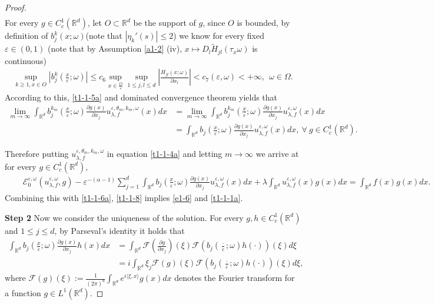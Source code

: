 \documentclass[11pt,draft, reqno]{amsart}
\renewcommand{\le}{\leqslant}
\renewcommand{\ge}{\geqslant}
\def\EE{{\mathcal E}}
\newcommand{\F}{\mathscr{F}}
\newcommand{\R}{\mathds R}
\newcommand{\e}{\varepsilon}
\newcommand{\w}{\omega}
\theoremstyle{definition}
\numberwithin{equation}{section}
\begin{document}
\begin{proof}
\begin{align*}
\end{align*}
For every $g\in C_c^1(\R^d)$, let $O\subset \R^d$ be the support of $g$, since $O$ is bounded, by definition of $b_j^k(x;\w)$(note that $|\eta_k'(s)|\le 2$)
we know for every fixed $\e\in (0,1)$ (note that by Assumption \ref{a1-2} (iv), $x\mapsto D_l\tilde H_{jl}(\tau_x \w)$ is continuous)
\begin{align*}
\sup_{k\ge 1, x\in O}|b_j^k\left(\frac{x}{\e};\w\right)|\le c_6\sup_{x\in \frac{O}{\e}}\sup_{1\le j,l\le d}\left|\frac{H_{jl}(x;\w)}{\partial x_l}\right|<c_7(\e,\w)<+\infty,\ \ \w\in \Omega.
\end{align*}
According to this, \eqref{t1-1-5a} and dominated convergence theorem yields that
\begin{align*}
\lim_{m \to \infty}\int_{\R^d}b_j^{k_m}\left(\frac{x}{\e};\w\right)\frac{\partial g(x)}{\partial x_j}u_{\lambda,f}^{\e,\theta_m,k_m,\w}(x)dx&=
\lim_{m \to \infty}\int_{\R^d}b_j^{k_m}\left(\frac{x}{\e};\w\right)\frac{\partial g(x)}{\partial x_j}u_{\lambda,f}^{\e,\w}(x)dx\\
&=\int_{\R^d}b_j\left(\frac{x}{\e};\w\right)\frac{\partial g(x)}{\partial x_j}u_{\lambda,f}^{\e,\w}(x)dx,\ \forall\ g\in C_c^1(\R^d).
\end{align*}

Therefore putting $u_{\lambda,f}^{\e,\theta_m,k_m,\w}$ in equation \eqref{t1-1-4a} and letting $m \to \infty$ we arrive at
for every $g\in C_c^1(\R^d)$,
\begin{equation*}
\begin{split}
&\quad \EE^{\e,\w}_0(u_{\lambda,f}^{\e,\w},g)-\e^{-(\alpha-1)}\sum_{j=1}^d \int_{\R^d}b_{j}\left(\frac{x}{\e};\w\right)\frac{\partial g(x)}{\partial x_j}u_{\lambda,f}^{\e,\w}(x)dx
+\lambda\int_{\R^d}u_{\lambda,f}^{\e,\w}(x)g(x)dx=\int_{\R^d}f(x)g(x)dx.
\end{split}
\end{equation*}
Combining this with \eqref{t1-1-6a}, \eqref{t1-1-8} implies \eqref{e1-6} and \eqref{t1-1-1a}.



{\bf Step 2} Now we consider the uniqueness of the solution.
For every $g,h\in C_c^1(\R^d)$ and $1\le j \le d$, by Parseval's identity it holds that
\begin{equation*}
\begin{split}
\int_{\R^d} b_j\left(\frac{x}{\e};\w\right)\frac{\partial g(x)}{\partial x_j} h(x)dx&=
\int_{\R^d}\F\left(\frac{\partial g}{\partial x_j}\right)(\xi)
\F\left(b_j\left(\frac{\cdot}{\e};\w\right)h(\cdot)\right)(\xi)d\xi\\
&=i \int_{\R^d}\xi_j\F(g)(\xi)\F\left(b_j\left(\frac{\cdot}{\e};\w\right)h(\cdot)\right)(\xi)d\xi,
\end{split}
\end{equation*}
where $\F(g)(\xi):=\frac{1}{(2\pi)^d}\int_{\R^d}e^{i\langle \xi, x\rangle}g(x)dx$ denotes
the Fourier transform for a function $g\in L^1(\R^d)$.


\end{proof}
\end{document}
